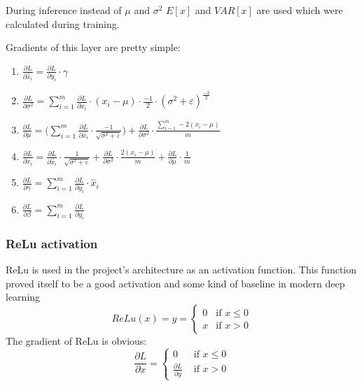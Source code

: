 During inference instead of $\mu$ and $\sigma^2$ $E[x]$ and $VAR[x]$ are used which were calculated during training.

Gradients of this layer are pretty simple:
\begin{enumerate}
    \item $\displaystyle \frac{\partial L}{\partial \hat{x}_i} = \frac{\partial L}{\partial y_i} \cdot \gamma$
    \item $\displaystyle \frac{\partial L}{\partial \sigma^2} = \sum\limits_{i=1}^m \frac{\partial L}{\partial \hat{x}_i} \cdot (x_i - \mu) \cdot \frac{-1}{2} \cdot
    {(\sigma^2+\varepsilon)}^{\frac{-3}{2}}$
    \item $\displaystyle \frac{\partial L}{\partial \mu} = \Big(\sum\limits_{i=1}^m \frac{\partial L}{\partial \hat{x}_i} \cdot \frac{-1}{\sqrt{\sigma^2 + \varepsilon}}\Big)
    + \frac{\partial L}{\partial \sigma^2 } \cdot \frac{\sum\limits_{i=1}^m -2(x_i-\mu)}{m}$
    \item $\displaystyle \frac{\partial L}{\partial x_i} = \frac{\partial L}{\partial \hat{x}_i} \cdot \frac{1}{\sqrt{\sigma^2 + \varepsilon}} +
    \frac{\partial L}{\partial \sigma^2} \cdot \frac{2(x_i-\mu)}{m} + \frac{\partial L}{\partial \mu} \cdot \frac{1}{m}$ 
    \item $\displaystyle \frac{\partial L}{\partial \gamma} = \sum\limits_{i=1}^m\frac{\partial L}{\partial y_i} \cdot \hat{x}_i$
    \item $\displaystyle \frac{\partial L}{\partial \beta} = \sum\limits_{i=1}^m\frac{\partial L}{\partial y_i}$
\end{enumerate}

\subsubsection{ReLu activation}
ReLu is used in the project's architecture as an activation function. This function proved itself to be a good activation and some kind of baseline in modern deep learning~\cite{relu}
\[
ReLu(x) = y =
\begin{cases}
    0 & \text{if } x \leq 0 \\
    x & \text{if } x > 0
\end{cases}    
\]
The gradient of ReLu is obvious:
\[
\frac{\partial L}{\partial x} = 
\begin{cases}
    0 & \text{ if } x \leq 0 \\
    \frac{\partial L}{\partial y} & \text{ if } x > 0
\end{cases}    
\]

